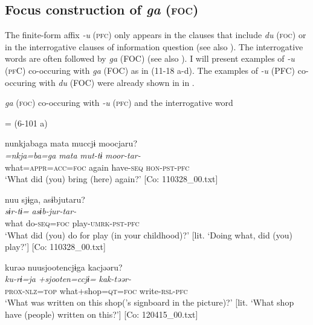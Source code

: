 \subsection{Focus construction of \textit{ga} (\textsc{foc})}\label{sec:11.3.2}

The finite-form affix \textit{{}-u} (\textsc{pfc}) only appears in the clauses that include \textit{du} (\textsc{foc}) or in the interrogative clauses of information question (see also ). The interrogative words are often followed by \textit{ga} (FOC) (see also ). I will present examples of \textit{{}-u} (\textsc{pf}C) co-occuring with \textit{ga} (FOC) as in (11-18 a-d). The examples of \textit{-u} (PFC) co-occuring with \textit{du} (FOC) were already shown in  in .

\ea\label{ex:11-18}  \textit{ga} (\textsc{foc}) co-occuring with \textit{{}-u} (\textsc{pfc}) and the interrogative word

  \ea{} = (6-101 a)

    
      \glll    nunkjabaga  mata  muccjɨ  moocjaru?\\
      \textit{=nkja=ba=ga}  \textit{mata}  \textit{mut-tɨ}  \textit{moor-tar-}\\
      what=\textsc{appr}=\textsc{acc}=\textsc{foc}  again  have-\textsc{seq}  \textsc{hon}-\textsc{pst}-\textsc{pfc}\\
      \glt       ‘What did (you) bring (here) again?’ [Co: 110328\_00.txt]

  \ex  
      \glll    nuu  sjɨga,  asɨbjutaru?\\
      \textit{}  \textit{sɨr-tɨ=}  \textit{asɨb-jur-tar-}\\
      what  do-\textsc{seq}=\textsc{foc}  play-\textsc{umrk}-\textsc{pst}-\textsc{pfc}\\
      \glt       ‘What did (you) do for play (in your childhood)?’ [lit. ‘Doing what, did (you) play?’] [Co: 110328\_00.txt]

  \ex  
      \glll    kurəə  nuu{\textbar}sjooten{\textbar}cjɨga  kacjəəru?\\
      \textit{ku-rɨ=ja}  \textit{+sjooten=ccjɨ=}  \textit{kak-təər-}\\
      \textsc{prox}-\textsc{nlz}=\textsc{top}  what+shop=\textsc{qt}=\textsc{foc}  write-\textsc{rsl}-\textsc{pfc}\\
      \glt        ‘What was written on this shop(’s signboard in the picture)?’ [lit. ‘What shop have (people) written on this?’]  [Co: 120415\_00.txt]

